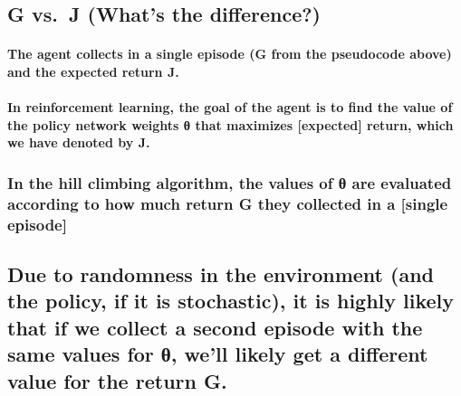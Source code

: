 \documentclass[11pt]{article}
\begin{document}
    \hypertarget{g-vs.j-whats-the-difference}{%
\subsection{G vs.~J (What's the
difference?)}\label{g-vs.j-whats-the-difference}}

\hypertarget{the-agent-collects-in-a-single-episode-g-from-the-pseudocode-above-and-the-expected-return-j.}{%
\paragraph{The agent collects in a single episode (G from the pseudocode
above) and the expected return
J.}\label{the-agent-collects-in-a-single-episode-g-from-the-pseudocode-above-and-the-expected-return-j.}}

\hypertarget{in-reinforcement-learning-the-goal-of-the-agent-is-to-find-the-value-of-the-policy-network-weights-ux3b8-that-maximizes-expected-return-which-we-have-denoted-by-j.}{%
\paragraph{In reinforcement learning, the goal of the agent is to find
the value of the policy network weights θ that maximizes {[}expected{]}
return, which we have denoted by
J.}\label{in-reinforcement-learning-the-goal-of-the-agent-is-to-find-the-value-of-the-policy-network-weights-ux3b8-that-maximizes-expected-return-which-we-have-denoted-by-j.}}

\hypertarget{in-the-hill-climbing-algorithm-the-values-of-ux3b8-are-evaluated-according-to-how-much-return-g-they-collected-in-a-single-episode}{%
\subsubsection{In the hill climbing algorithm, the values of θ are
evaluated according to how much return G they collected in a {[}single
episode{]}}\label{in-the-hill-climbing-algorithm-the-values-of-ux3b8-are-evaluated-according-to-how-much-return-g-they-collected-in-a-single-episode}}

\hypertarget{due-to-randomness-in-the-environment-and-the-policy-if-it-is-stochastic-it-is-highly-likely-that-if-we-collect-a-second-episode-with-the-same-values-for-ux3b8-well-likely-get-a-different-value-for-the-return-g.}{%
\subsection{Due to randomness in the environment (and the policy, if it
is stochastic), it is highly likely that if we collect a second episode
with the same values for θ, we'll likely get a different value for the
return
G.}\label{due-to-randomness-in-the-environment-and-the-policy-if-it-is-stochastic-it-is-highly-likely-that-if-we-collect-a-second-episode-with-the-same-values-for-ux3b8-well-likely-get-a-different-value-for-the-return-g.}}
\end{document}
